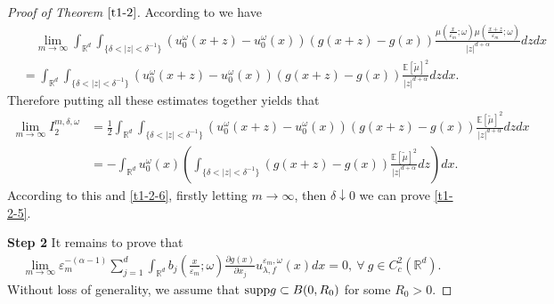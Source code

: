 \documentclass[11pt,draft, reqno]{amsart}
\renewcommand{\le}{\leqslant}
\newcommand{\R}{\mathds R}
\newcommand{\e}{\varepsilon}
\newcommand{\Pp}{\mathds P}
\newcommand{\Ee}{\mathds E}
\newcommand{\w}{\omega}
\theoremstyle{definition}
\numberwithin{equation}{section}
\begin{document}
\begin{proof} [Proof of Theorem $\ref{t1-2}$]
According to \cite[Lemma 3.1(ii)]{CCKW1} we have
\begin{align*}
&\quad \lim_{m \to \infty}\int_{\R^d}\int_{\{\delta<|z|<\delta^{-1}\}}
\left(u_{0}^{\w}(x+z)-u_0^\w(x)\right)\left(g(x+z)-g(x)\right)
\frac{\mu\left(\frac{x}{\e_m};\w\right)\mu\left(\frac{x+z}{\e_m};\w\right)}{|z|^{d+\alpha}}dzdx\\
&=\int_{\R^d}\int_{\{\delta<|z|<\delta^{-1}\}}
\left(u_{0}^{\w}(x+z)-u_0^\w(x)\right)\left(g(x+z)-g(x)\right)
\frac{\Ee[\tilde \mu]^2}{|z|^{d+\alpha}}dzdx.
\end{align*}
Therefore putting all these estimates together yields that
\begin{align*}
\lim_{m \to \infty}I_2^{m,\delta,\w}&=\frac{1}{2}\int_{\R^d}\int_{\{\delta<|z|<\delta^{-1}\}}
\left(u_{0}^{\w}(x+z)-u_0^\w(x)\right)\left(g(x+z)-g(x)\right)
\frac{\Ee[\tilde \mu]^2}{|z|^{d+\alpha}}dzdx\\
&=-\int_{\R^d}u_0^{\w}(x)\left(\int_{\{\delta<|z|<\delta^{-1}\}}\left(g(x+z)-g(x)\right)
\frac{\Ee[\tilde \mu]^2}{|z|^{d+\alpha}}dz\right)dx.
\end{align*}
According to this and \eqref{t1-2-6}, firstly letting $m \to \infty$, then $\delta \downarrow 0$ we
can prove \eqref{t1-2-5}.

{\bf Step 2} It remains to prove that
\begin{align}\label{t1-2-7}
\lim_{m \to \infty}\e_m^{-(\alpha-1)}\sum_{j=1}^d\int_{\R^d}b_j\left(\frac{x}{\e_m};\w\right)\frac{\partial g(x)}{\partial x_j}u_{\lambda,f}^{\e_m,\w}(x)dx=0,
\ \forall\ g\in C_c^2(\R^d).
\end{align}
Without loss of generality, we assume that ${\rm supp}g\subset B(0,R_0)$ for some $R_0>0$.



\end{proof}
\end{document}
